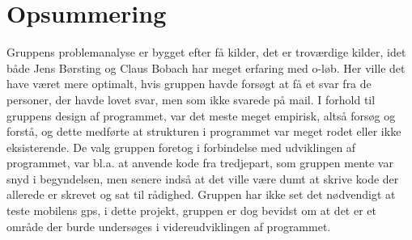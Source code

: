 \section{Opsummering}
Gruppens problemanalyse er bygget efter få kilder, det er troværdige kilder, idet både Jens Børsting og Claus Bobach har meget erfaring med o-løb. Her ville det have været mere optimalt, hvis gruppen havde forsøgt at få et svar fra de personer, der havde lovet svar, men som ikke svarede på mail. \newline
I forhold til gruppens design af programmet, var det meste meget empirisk, altså forsøg og forstå, og dette medførte at strukturen i programmet var meget rodet eller ikke eksisterende. \newline
De valg gruppen foretog i forbindelse med udviklingen af programmet, var bl.a. at anvende kode fra tredjepart, som gruppen mente var snyd i begyndelsen, men senere indså at det ville være dumt at skrive kode der allerede er skrevet og sat til rådighed.
Gruppen har ikke set det nødvendigt at teste mobilens gps, i dette projekt, gruppen er dog bevidst om at det er et område der burde undersøges i videreudviklingen af programmet.

